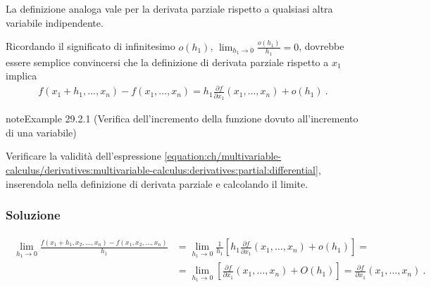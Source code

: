 \documentclass[letterpaper,10pt,italian]{jupyterBook}
\begin{document}
\sphinxAtStartPar
La definizione analoga vale per la derivata parziale rispetto a qualsiasi altra variabile indipendente.

\sphinxAtStartPar
Ricordando il significato di infinitesimo \(o(h_1)\), \(\lim_{h_1 \rightarrow 0} \frac{o(h_1)}{h_1} = 0\), dovrebbe essere semplice convincersi che la definizione di derivata parziale rispetto a \(x_1\) implica
\begin{equation}\label{equation:ch/multivariable-calculus/derivatives:multivariable-calculus:derivatives:partial:differential}
\begin{split}
  f(x_1+h_1, \dots, x_n) - f(x_1, \dots, x_n) = h_1 \frac{\partial f}{\partial x_1}(x_1, \dots, x_n) + o(h_1) \ .
\end{split}
\end{equation}\label{ch/multivariable-calculus/derivatives:multivariable-calculus:increment-1}
\begin{sphinxadmonition}{note}{Example 29.2.1 (Verifica dell’incremento della funzione dovuto all’incremento di una variabile)}



\sphinxAtStartPar
Verificare la validità dell’espressione \eqref{equation:ch/multivariable-calculus/derivatives:multivariable-calculus:derivatives:partial:differential}, inserendola nella definizione di derivata parziale e calcolando il limite.
\subsubsection*{Soluzione}
\begin{equation*}
\begin{split}\begin{aligned}
  \lim_{h_1 \rightarrow 0} \frac{f(x_1+h_1, x_2, \dots, x_n) - f(x_1, x_2, \dots, x_n)}{h_1} & = 
  \lim_{h_1 \rightarrow 0} \frac{1}{h_1} \left[ h_1 \frac{\partial f}{\partial x_1}(x_1, \dots, x_n) + o(h_1) \right] = \\
  & = \lim_{h_1 \rightarrow 0} \left[ \frac{\partial f}{\partial x_1}(x_1, \dots, x_n) + O(h_1) \right] = \frac{\partial f}{\partial x_1}(x_1, \dots, x_n) \ .
\end{aligned}\end{split}
\end{equation*}\end{sphinxadmonition}
\end{document}
